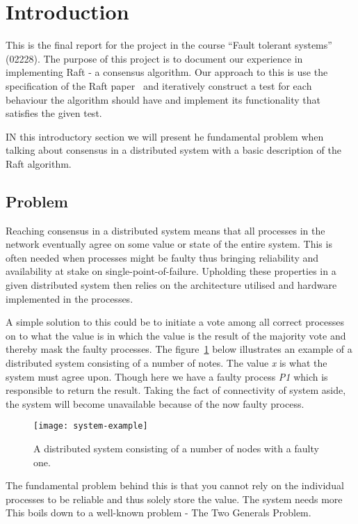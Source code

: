 \setcounter{page}{1}

\section{Introduction} %
\label{sec:introduction}

This is the final report for the project in the course ``Fault tolerant systems'' (02228). The purpose of this project is to document our experience in implementing Raft - a consensus algorithm. Our approach to this is use the specification of the Raft paper~\cite[p.~4]{Raft} and iteratively construct a test for each behaviour the algorithm should have and implement its functionality that satisfies the given test.

IN this introductory section we will present he fundamental problem when talking about consensus in a distributed system with a basic description of the Raft algorithm.

\subsection{Problem}
Reaching consensus in a distributed system means that all processes in the network eventually agree on some value or state of the entire system. This is often needed when processes might be faulty thus bringing reliability and availability at stake on single-point-of-failure. Upholding these properties in a given distributed system then relies on the architecture utilised and hardware implemented in the processes.

A simple solution to this could be to initiate a vote among all correct processes on to what the value is in which the value is the result of the majority vote and thereby mask the faulty processes. The figure~\ref{consensus} below illustrates an example of a distributed system consisting of a number of notes. The value \textit{x} is what the system must agree upon. Though here we have a faulty process \textit{P1} which is responsible to return the result. Taking the fact of connectivity of system aside, the system will become unavailable because of the now faulty process.

\begin{figure}[h]
	\centering
	\texttt{[image: system-example]}
	\caption{A distributed system consisting of a number of nodes with a faulty one.}
	\label{consensus}
\end{figure}

The fundamental problem behind this is that you cannot rely on the individual processes to be reliable and thus solely store the value. The system needs more This boils down to a well-known problem - The Two Generals Problem.

